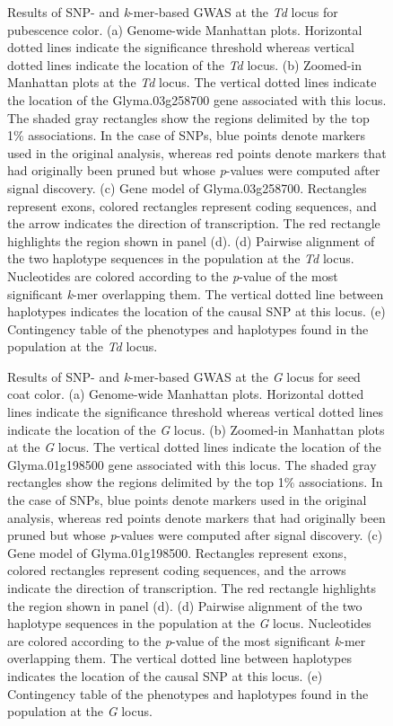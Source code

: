\documentclass{article}
\begin{document}
\begin{figure}[p]
	\caption{Results of SNP- and \textit{k}-mer-based GWAS at the
	\textit{Td} locus for pubescence color. (a) Genome-wide Manhattan plots.
	Horizontal dotted lines indicate the significance
	threshold whereas vertical dotted lines indicate the location of the
	\textit{Td} locus. (b) Zoomed-in Manhattan plots at the \textit{Td} locus.
	The vertical dotted lines indicate the location of the
	Glyma.03g258700 gene associated with this locus. The shaded gray
	rectangles show the regions delimited by the top 1\% associations.
	In the case of SNPs, blue points denote markers used in the
	original analysis, whereas red points denote markers that had originally
	been pruned but whose \emph{p}-values were computed after signal
	discovery.
	(c) Gene model of Glyma.03g258700. Rectangles represent exons, colored
	rectangles represent coding sequences, and the arrow indicates the
	direction of transcription. The red rectangle highlights the region
	shown in panel (d). (d) Pairwise alignment of the two haplotype
	sequences in the population at the \textit{Td} locus. Nucleotides are
	colored according to the
	\textit{p}-value of the most significant \textit{k}-mer overlapping
	them. The vertical dotted line between haplotypes indicates the location of
	the causal SNP at this locus. (e) Contingency table of
	the phenotypes and haplotypes found in the population at the
	\textit{Td} locus.}
	\label{pubescence-color-main-figure}
\end{figure}

\begin{figure}[p]
	\caption{Results of SNP- and \textit{k}-mer-based GWAS at the
	\textit{G} locus for seed coat color. (a) Genome-wide Manhattan plots.
	Horizontal dotted lines indicate the significance
	threshold whereas vertical dotted lines indicate the location of the
	\textit{G} locus. (b) Zoomed-in Manhattan plots at the \textit{G} locus.
	The vertical dotted lines indicate the location of the
	Glyma.01g198500 gene associated with this locus. The shaded gray
	rectangles show the regions delimited by the top 1\% associations.
	In the case of SNPs, blue points denote markers used in the
	original analysis, whereas red points denote markers that had originally
	been pruned but whose \emph{p}-values were computed after signal
	discovery.
	(c) Gene model of Glyma.01g198500. Rectangles represent exons, colored
	rectangles represent coding sequences, and the arrows indicate the
	direction of transcription. The red rectangle highlights the region
	shown in panel (d). (d) Pairwise alignment of the two haplotype
	sequences in the population at the \textit{G} locus. Nucleotides are
	colored according to the
	\textit{p}-value of the most significant \textit{k}-mer overlapping
	them. The vertical dotted line between haplotypes indicates the location of
	the causal SNP at this locus. (e) Contingency table of
	the phenotypes and haplotypes found in the population at the
	\textit{G} locus.}
	\label{seed-coat-color-main-figure}
\end{figure}
\end{document}
